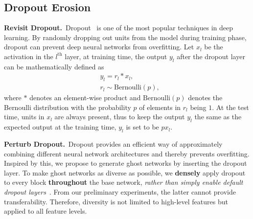 \documentclass[letterpaper]{article} %
\begin{document}
\subsection{Dropout Erosion} \label{sec:dropout}
\vspace{1ex}\noindent\textbf{Revisit Dropout.}~Dropout~\cite{srivastava2014dropout} is one of the most popular techniques in deep learning. By randomly dropping out units from the model during training phase, dropout can prevent deep neural networks from overfitting. 
Let $x_l$ be the activation in the $l^\text{th}$ layer, at training time, the output $y_l$ after the dropout layer can be mathematically defined as
\begin{equation} \label{eq:dropout}
\begin{split}
& y_l=r_l*x_l, \\
& r_l\sim\text{Bernoulli}(p),
\end{split}
\end{equation}
where $*$ denotes an element-wise product and $\text{Bernoulli}(p)$ denotes the Bernoulli distribution with the probability $p$ of elements in $r_l$ being $1$. At the test time, units in $x_l$ are always present, thus to keep the output $y_l$ the same as the expected output at the training time, $y_l$ is set to be $p x_l$.

\vspace{1ex}\noindent\textbf{Perturb Dropout.}~Dropout provides an efficient way of approximately combining different neural network architectures and thereby prevents overfitting. Inspired by this, we propose to generate ghost networks by inserting the dropout layer. To make ghost networks as diverse as possible, we \textbf{densely} apply dropout to every block \textbf{throughout} the base network, \textit{rather than simply enable default dropout layers~\cite{carlini2017adversarial}}. From our preliminary experiments, the latter cannot provide transferability. Therefore, diversity is not limited to high-level features but applied to all feature levels. 
\end{document}
